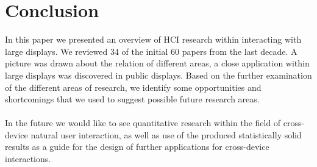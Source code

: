 \section{Conclusion}\label{Sec:Conclusion}
In this paper we presented an overview of HCI research within interacting with large displays. We reviewed 34 of the initial 60 papers from the last decade. A picture was drawn about the relation of different areas, a close application within large displays was discovered in public displays. Based on the further examination of the different areas of research, we identify some opportunities and shortcomings that we used to suggest possible future research areas.\\
\\

In the future we would like to see quantitative research within the field of cross-device natural user interaction, as well as use of the produced statistically solid results as a guide for the design of further applications for cross-device interactions.\\